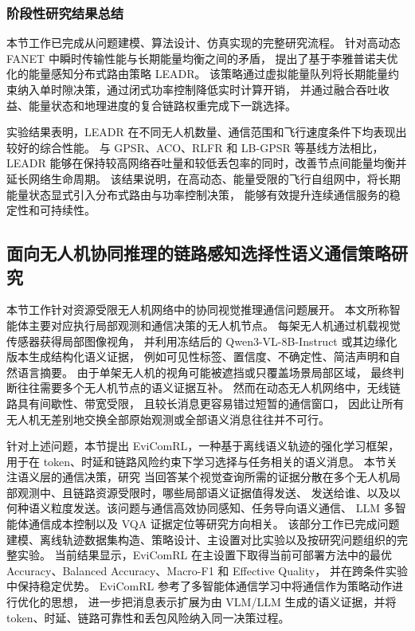 \subsubsection{阶段性研究结果总结}

本节工作已完成从问题建模、算法设计、仿真实现的完整研究流程。
针对高动态 FANET 中瞬时传输性能与长期能量均衡之间的矛盾，
提出了基于李雅普诺夫优化的能量感知分布式路由策略 LEADR。
该策略通过虚拟能量队列将长期能量约束纳入单时隙决策，通过闭式功率控制降低实时计算开销，
并通过融合吞吐收益、能量状态和地理进度的复合链路权重完成下一跳选择。

实验结果表明，LEADR 在不同无人机数量、通信范围和飞行速度条件下均表现出较好的综合性能。
与 GPSR、ACO、RLFR 和 LB-GPSR 等基线方法相比，
LEADR 能够在保持较高网络吞吐量和较低丢包率的同时，改善节点间能量均衡并延长网络生命周期。
该结果说明，在高动态、能量受限的飞行自组网中，将长期能量状态显式引入分布式路由与功率控制决策，
能够有效提升连续通信服务的稳定性和可持续性。

\subsection{面向无人机协同推理的链路感知选择性语义通信策略研究}
本节工作针对资源受限无人机网络中的协同视觉推理通信问题展开。
本文所称智能体主要对应执行局部观测和通信决策的无人机节点。
每架无人机通过机载视觉传感器获得局部图像视角，
并利用冻结后的 Qwen3-VL-8B-Instruct 或其边缘化版本生成结构化语义证据，
例如可见性标签、置信度、不确定性、简洁声明和自然语言摘要。
由于单架无人机的视角可能被遮挡或只覆盖场景局部区域，
最终判断往往需要多个无人机节点的语义证据互补。
然而在动态无人机网络中，无线链路具有间歇性、带宽受限，
且较长消息更容易错过短暂的通信窗口，
因此让所有无人机无差别地交换全部原始观测或全部语义消息往往并不可行。

针对上述问题，本节提出 EviComRL，一种基于离线语义轨迹的强化学习框架，
用于在 token、时延和链路风险约束下学习选择与任务相关的语义消息。
本节关注语义层的通信决策，研究
当回答某个视觉查询所需的证据分散在多个无人机局部观测中、且链路资源受限时，哪些局部语义证据值得发送、
发送给谁、以及以何种语义粒度发送。该问题与通信高效协同感知、任务导向语义通信、
LLM 多智能体通信成本控制以及 VQA 证据定位等研究方向相关。
该部分工作已完成问题建模、离线轨迹数据集构造、策略设计、主设置对比实验以及按研究问题组织的完整实验。
当前结果显示，EviComRL 在主设置下取得当前可部署方法中的最优 Accuracy、Balanced Accuracy、Macro-F1 和 Effective Quality，
并在跨条件实验中保持稳定优势。
EviComRL 参考了多智能体通信学习中将通信作为策略动作进行优化的思想，
进一步把消息表示扩展为由 VLM/LLM 生成的语义证据，并将 token、时延、链路可靠性和丢包风险纳入同一决策过程。

